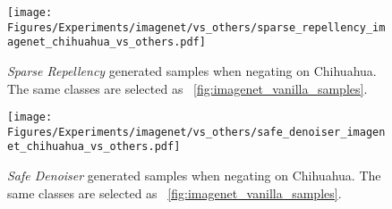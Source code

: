 \begin{figure*}[!ht]
    \centering
    \texttt{[image: Figures/Experiments/imagenet/vs\_others/sparse\_repellency\_imagenet\_chihuahua\_vs\_others.pdf]}
    \caption{\textit{Sparse Repellency} generated samples when negating on Chihuahua. The same classes are selected as ~\ref{fig:imagenet_vanilla_samples}.}
    \label{fig:imagenet_sparse_repellency_samples}
\end{figure*}


\begin{figure*}[!ht]
    \centering
    \texttt{[image: Figures/Experiments/imagenet/vs\_others/safe\_denoiser\_imagenet\_chihuahua\_vs\_others.pdf]}
    \caption{\textit{Safe Denoiser} generated samples when negating on Chihuahua. The same classes are selected as ~\ref{fig:imagenet_vanilla_samples}.}
    \label{fig:imagenet_safe_denoiser_samples}
\end{figure*}